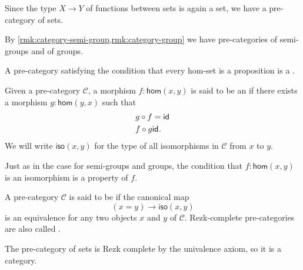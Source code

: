 \begin{eg}
  Since the type $X\to Y$ of functions between sets is again a set, we have a pre-category of sets.
\end{eg}

\begin{eg}
  By \cref{rmk:category-semi-group,rmk:category-group} we have pre-categories of semi-groups and of groups.
\end{eg}

\begin{eg}
  A pre-category satisfying the condition that every hom-set is a proposition is a . 
\end{eg}

\begin{defn}
  Given a pre-category $\mathcal{C}$, a morphism $f:\mathsf{hom}(x,y)$ is said to be an  if there exists a morphism $g:\mathsf{hom}(y,x)$ such that
  \begin{align*}
    g\circ f & = \mathsf{id}_{} \\
    f \circ g & \mathsf{id}_{}.
  \end{align*}
  We will write $\mathsf{iso}(x,y)$ for the type of all isomorphisms in $\mathcal{C}$ from $x$ to $y$.
\end{defn}

\begin{rmk}
  Just as in the case for semi-groups and groups, the condition that $f:\mathsf{hom}(x,y)$ is an isomorphism is a property of $f$.
\end{rmk}

\begin{defn}
  A pre-category $\mathcal{C}$ is said to be  if the canonical map
  \begin{equation*}
    (x=y)\to \mathsf{iso}(x,y)
  \end{equation*}
  is an equivalence for any two objects $x$ and $y$ of $\mathcal{C}$. Rezk-complete pre-categories are also called .
\end{defn}

\begin{eg}
  The pre-category of sets is Rezk complete by the univalence axiom, so it is a category.
\end{eg}

